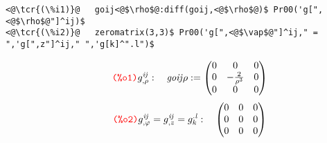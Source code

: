 \documentclass[../Maxima_Workbook.tex]{subfiles}
\begin{document}
\lz \begin{small}
\color{blue} \leqn
\begin{lstlisting}
<@\tcr{(\%i1)}@   goij<@$\rho$@:diff(goij,<@$\rho$@)$ Pr00('g[",<@$\rho$@"]^ij)$
<@\tcr{(\%i2)}@   zeromatrix(3,3)$ Pr00('g[",<@$\vap$@"]^ij," = ",'g[",z"]^ij," ",'g[k]^".l")$
\end{lstlisting}
\vspace{-4mm} \[\tag*{\tcr{\ttfamily (\%o1)}} {{g}_{,\rho }^{\mathit{ij}}}: \quad \mathit{goij\rho } := \begin{pmatrix}0 & 0 & 0\\
0 & -\frac{2}{{{\rho }^{3}}} & 0\\
0 & 0 & 0\end{pmatrix} \]
\vspace{-6mm} \[\tag*{\tcr{\ttfamily (\%o2)}} {{g}_{,\vap }^{\mathit{ij}}} = {{g}_{,z}^{\mathit{ij}}} = {{g}_{k}^{\mathit{.l}}} : \quad \begin{pmatrix}0 & 0 & 0\\
0 & 0 & 0\\
0 & 0 & 0\end{pmatrix} \]
\color{black}
\end{small} \reqn
\vspace{-7mm} 
\end{document}
